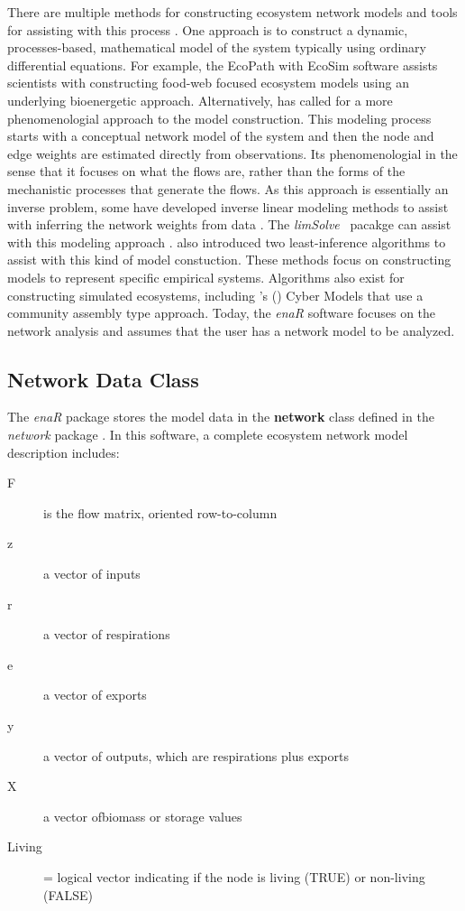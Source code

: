 \documentclass[article]{jss}
\newcommand{\R}{\proglang{R}}
\def\citeapos#1{\citeauthor{#1}'s (\citeyear{#1})}
\begin{document}
There are multiple methods for constructing ecosystem network models
and tools for assisting with this process
\citep{fath07_netconstruction}.  One approach is to construct a
dynamic, processes-based, mathematical model of the system typically
using ordinary differential equations.  For example, the EcoPath with
EcoSim \citep{christensen92, christensen95} software assists
scientists with constructing food-web focused ecosystem models using
an underlying bioenergetic approach.  Alternatively,
\citet{ulanowicz86} has called for a more phenomenologial approach to
the model construction.  This modeling process starts with a
conceptual network model of the system and then the node and edge
weights are estimated directly from observations.  Its phenomenologial
in the sense that it focuses on what the flows are, rather than the
forms of the mechanistic processes that generate the flows.  As this
approach is essentially an inverse problem, some have developed
inverse linear modeling methods to assist with inferring the network
weights from data \citep{vezina1988, vanoevelen2010}.  The
\textit{limSolve} \R\ pacakge can assist with this modeling approach
\citep{soetaert09}.  \citet{ulanowicz2008least} also introduced two
least-inference algorithms to assist with this kind of model
constuction.  These methods focus on constructing models to represent
specific empirical systems.  Algorithms also exist for constructing
simulated ecosystems, including \citeapos{fath04_cyber} Cyber Models that
use a community assembly type approach. Today, the \textit{enaR}
software focuses on the network analysis and assumes that the user has
a network model to be analyzed.

\subsection{Network Data Class}

The \textit{enaR} package stores the model data in the
\textbf{network} class defined in the \textit{network} package
\citep[see][for details]{butts08_network}. In this software, a
complete ecosystem network model description includes:

\begin{description}
\item[F] is the flow matrix, oriented row-to-column
\item[z] a vector of inputs
\item[r] a vector of respirations
\item[e] a vector of exports
\item[y] a vector of outputs, which are respirations plus exports
\item[X] a vector ofbiomass or storage values
\item[Living] = logical vector indicating if the node is living
  (TRUE) or non-living (FALSE)
\end{description}
\end{document}
